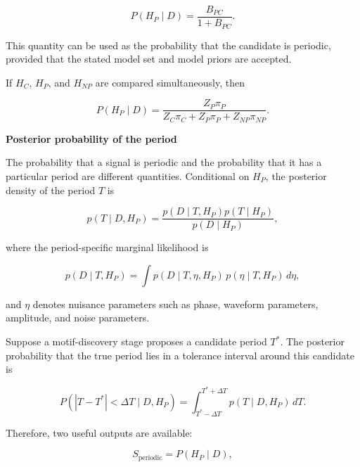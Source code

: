 \documentclass{book}
\providecommand{\ProjectDeepHeading}[2]{%
    \par\medskip\noindent\textbf{#2}\par\smallskip
}
\begin{document}
\begin{equation}
P(H_P\mid D)
=
\frac{B_{PC}}{1+B_{PC}}.
\end{equation}

This quantity can be used as the probability that the candidate is periodic, provided that the stated model set and model priors are accepted.

If $H_C$, $H_P$, and $H_{NP}$ are compared simultaneously, then

\begin{equation}
P(H_P\mid D)
=
\frac{Z_P\ensuremath{\pi}_P}
{Z_C\ensuremath{\pi}_C+Z_P\ensuremath{\pi}_P+Z_{NP}\ensuremath{\pi}_{NP}}.
\end{equation}

\ProjectDeepHeading{4}{Posterior probability of the period}

The probability that a signal is periodic and the probability that it has a particular period are different quantities. Conditional on $H_P$, the posterior density of the period $T$ is

\begin{equation}
p(T\mid D,H_P)
=
\frac{p(D\mid T,H_P)p(T\mid H_P)}
{p(D\mid H_P)},
\end{equation}

where the period-specific marginal likelihood is

\begin{equation}
p(D\mid T,H_P)
=
\int
p(D\mid T,\ensuremath{\eta},H_P)
\,p(\ensuremath{\eta}\mid T,H_P)
\,d\ensuremath{\eta},
\end{equation}

and $\ensuremath{\eta}$ denotes nuisance parameters such as phase, waveform parameters, amplitude, and noise parameters.

Suppose a motif-discovery stage proposes a candidate period $T^{\ast}$. The posterior probability that the true period lies in a tolerance interval around this candidate is

\begin{equation}
P\left(\left|T-T^{\ast}\right|<\ensuremath{\Delta} T\mid D,H_P\right)
=
\int_{T^{\ast}-\ensuremath{\Delta} T}^{T^{\ast}+\ensuremath{\Delta} T}
p(T\mid D,H_P)\,dT.
\end{equation}

Therefore, two useful outputs are available:

\begin{equation}
S_{\mathrm{periodic}}
=
P(H_P\mid D),
\end{equation}
\end{document}
